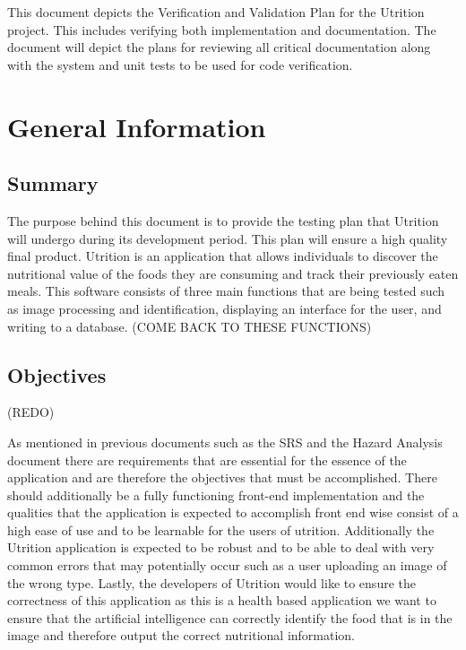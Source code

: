 \documentclass[12pt, titlepage]{article}
\begin{document}
	
	\newpage
	
	
	This document depicts the Verification and Validation Plan for the Utrition project. This includes verifying both implementation and documentation. The document will depict the plans for reviewing all critical documentation along with the system and unit tests to be used for code verification.  
	
	\section{General Information}
	
	\subsection{Summary}
	
		The purpose behind this document is to provide the testing plan that Utrition will undergo during its development period. This plan will ensure a high quality final product. Utrition is an application that allows individuals to discover the nutritional value of the foods they are consuming and track their previously eaten meals. This software consists of three main functions that are being tested such as image processing and identification, displaying an interface for the user, and writing to a database. (COME BACK TO THESE FUNCTIONS)
	
	\subsection{Objectives} (REDO)
	
		
		As mentioned in previous documents such as the SRS and the Hazard Analysis document there are requirements that are essential for the essence of the application and are therefore the objectives that must be accomplished. There should additionally be a fully functioning front-end implementation and the qualities that the application is expected to accomplish front end wise consist of a high ease of use and to be learnable for the users of utrition. Additionally the Utrition application is expected to be robust and to be able to deal with very common errors that may potentially occur such as a user uploading an image of the wrong type. Lastly, the developers of Utrition would like to ensure the correctness of this application as this is a health based application we want to ensure that the artificial intelligence can correctly identify the food that is in the image and therefore output the correct nutritional information.
	
\end{document}
